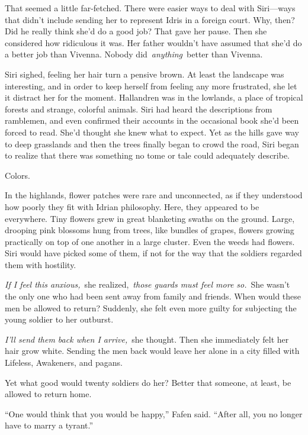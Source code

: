 That seemed a little far-fetched. There were easier ways to deal with Siri—ways that didn’t include sending her to represent Idris in a foreign court. Why, then? Did he really think she’d do a good job? That gave her pause. Then she considered how ridiculous it was. Her father wouldn’t have assumed that she’d do a better job than Vivenna. Nobody did~\textit{anything}~better than Vivenna.

Siri sighed, feeling her hair turn a pensive brown. At least the landscape was interesting, and in order to keep herself from feeling any more frustrated, she let it distract her for the moment. Hallandren was in the lowlands, a place of tropical forests and strange, colorful animals. Siri had heard the descriptions from ramblemen, and even confirmed their accounts in the occasional book she’d been forced to read. She’d thought she knew what to expect. Yet as the hills gave way to deep grasslands and then the trees finally began to crowd the road, Siri began to realize that there was something no tome or tale could adequately describe.

Colors.

In the highlands, flower patches were rare and unconnected, as if they understood how poorly they fit with Idrian philosophy. Here, they appeared to be everywhere. Tiny flowers grew in great blanketing swaths on the ground. Large, drooping pink blossoms hung from trees, like bundles of grapes, flowers growing practically on top of one another in a large cluster. Even the weeds had flowers. Siri would have picked some of them, if not for the way that the soldiers regarded them with hostility.

\textit{If I feel this anxious,}~she realized,~\textit{those guards must feel more so.}~She wasn’t the only one who had been sent away from family and friends. When would these men be allowed to return? Suddenly, she felt even more guilty for subjecting the young soldier to her outburst.

\textit{I’ll send them back when I arrive,}~she thought. Then she immediately felt her hair grow white. Sending the men back would leave her alone in a city filled with Lifeless, Awakeners, and pagans.

Yet what good would twenty soldiers do her? Better that someone, at least, be allowed to return home.

\orn

“One would think that you would be happy,” Fafen said. “After all, you no longer have to marry a tyrant.”

